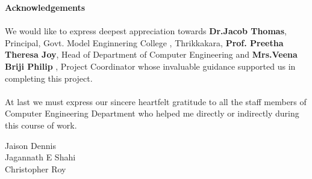 \documentclass[11pt]{report}
\begin{document}
\begin{center}
	\thispagestyle{empty}
	\LARGE{\textbf{Acknowledgements}}\\[1cm]
\end{center}
\linespread{1.13}
\large{\paragraph{}We would like to express deepest appreciation towards \textbf{Dr.Jacob Thomas},
	Principal, Govt. Model Enginnering College , Thrikkakara, \textbf{Prof. Preetha Theresa Joy}, 
	Head of Department of Computer Engineering and \textbf{Mrs.Veena Briji Philip }, Project Coordinator whose
	invaluable guidance supported us in completing this project.}
\large{\paragraph{}At last we must express our sincere heartfelt gratitude to all the staff members
	of Computer Engineering Department who helped me directly or indirectly during this course of work.}
\begin{flushright}
	{
		Jaison Dennis\\
		Jagannath E Shahi\\
		Christopher Roy
	}
\end{flushright}
\newpage
 
\begin{abstract}
This project is based on an e-commerce platform ‘E-Kart’ which sells goods and services online. E-Kart has the following features : \\
\\◦ Create account for Users and Sellers.\\
◦ Authentication for user Protection and Privacy.\\
◦ Provision to Add Products to cart and Buy them at a later time.\\
◦ Search and filter products based on Price, Brand and Offers.\\
◦ Users can post Reviews and Ratings.\\
◦ Show Order and Delivery status.\\
◦ Admin Dashboard and seller Dashboard.\\
◦ Users can add Products of their choice to Wishlist.\\
◦ Sellers can add offers and modify their products.
\end{abstract}

\tableofcontents
\end{document}
